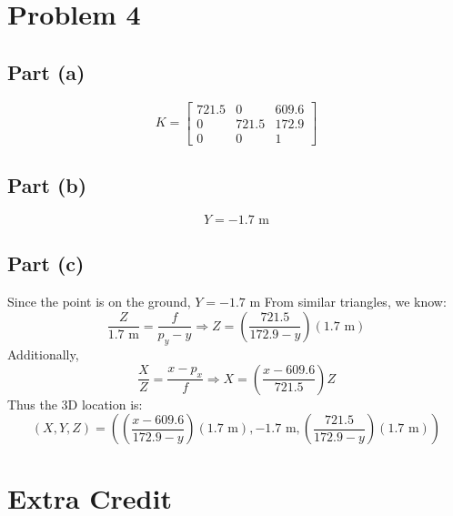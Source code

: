 \documentclass[12pt]{article}
\begin{document}
\section*{Problem 4}

\subsection*{Part (a)}

\begin{equation}
    K = \begin{bmatrix}
        721.5 & 0     & 609.6 \\
        0     & 721.5 & 172.9 \\
        0     & 0     & 1
    \end{bmatrix}
\end{equation}

\subsection*{Part (b)}

\begin{equation}
    Y = -1.7 \text{ m}
\end{equation}

\subsection*{Part (c)}

Since the point is on the ground, $Y = -1.7 \text{ m}$ From similar triangles,
we know:
%
\begin{equation}
    \frac{Z}{1.7 \text{ m}} = \frac{f}{p_y - y} \Rightarrow Z = \left(\frac{721.5}{172.9 - y}\right) (1.7 \text{ m})
\end{equation}
%
Additionally,
%
\begin{equation}
    \frac{X}{Z} = \frac{x - p_x}{f} \Rightarrow X = \left(\frac{x - 609.6}{721.5}\right) Z
\end{equation}
%
Thus the 3D location is:
%
\begin{equation}
    (X, Y, Z) = \left(\left(\frac{x - 609.6}{172.9 - y}\right) (1.7 \text{ m}),
                -1.7 \text{ m}, \left(\frac{721.5}{172.9 - y}\right) (1.7 \text{ m}) \right)
\end{equation}

\section*{Extra Credit}
\end{document}
